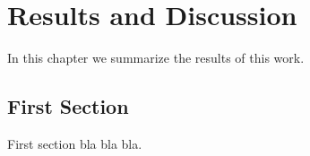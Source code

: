 \chapter{Results and Discussion}
\label{chp:results}

In this chapter we summarize the results of this work.


\section{First Section}
\label{sec:first_sec}
First section bla bla bla. 